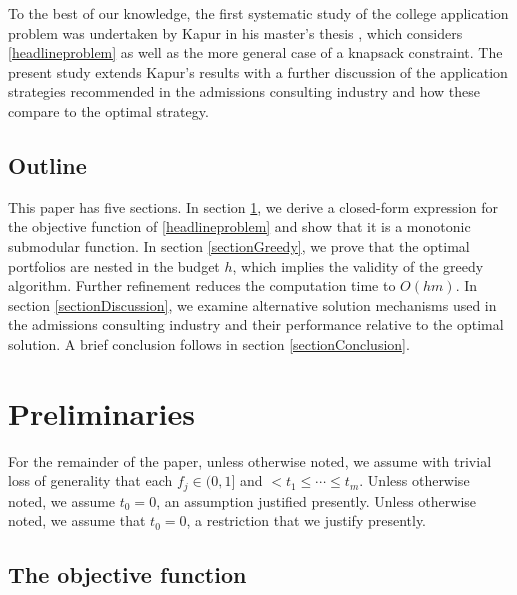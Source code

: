 

To the best of our knowledge, the first systematic study of the college application problem was undertaken by Kapur in his master's thesis \cite{kapur2022}, which considers \eqref{headlineproblem} as well as the more general case of a knapsack constraint. The present study extends Kapur's results with a further discussion of the application strategies recommended in the admissions consulting industry and how these compare to the optimal strategy.

\subsection{Outline}

This paper has five sections. In section \ref{sectionModel}, we derive a closed-form expression for the objective function of \eqref{headlineproblem} and show that it is a monotonic submodular function. In section \ref{sectionGreedy}, we prove that the optimal portfolios are nested in the budget $h$, which implies the validity of the greedy algorithm. Further refinement reduces the computation time to $O(hm)$. In section \ref{sectionDiscussion}, we examine alternative solution mechanisms used in the admissions consulting industry and their performance relative to the optimal solution. A brief conclusion follows in section \ref{sectionConclusion}.







\section{Preliminaries} \label{sectionModel}

For the remainder of the paper, unless otherwise noted, we assume with trivial loss of generality that each $f_j \in (0, 1]$ and $< t_1 \leq \cdots \leq t_m$. Unless otherwise noted, we assume $t_0 = 0$, an assumption justified presently. Unless otherwise noted, we assume that $t_0 = 0$, a restriction that we justify presently.


\subsection{The objective function} \label{sectionObjective}

